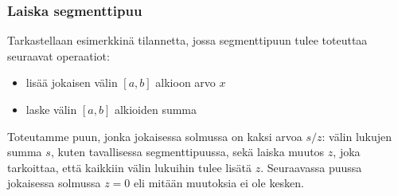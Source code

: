 \subsubsection{Laiska segmenttipuu}

Tarkastellaan esimerkkinä tilannetta,
jossa segmenttipuun
tulee toteuttaa seuraavat operaatiot:
\begin{itemize}
\item lisää jokaisen välin $[a,b]$ alkioon arvo $x$
\item laske välin $[a,b]$ alkioiden summa
\end{itemize}
Toteutamme puun, jonka jokaisessa
solmussa on kaksi arvoa $s/z$:
välin lukujen summa $s$,
kuten tavallisessa segmenttipuussa, sekä
laiska muutos $z$,
joka tarkoittaa,
että kaikkiin välin lukuihin tulee lisätä $z$.
Seuraavassa puussa jokaisessa solmussa $z=0$
eli mitään muutoksia ei ole kesken.
